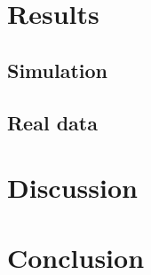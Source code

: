 \documentclass[aps,prd,twocolumn,superscriptaddress,preprintnumbers,nofootinbib,hidelinks]{revtex4-2}
\begin{document}
\section{Results}
\label{sec:results}

\subsection{Simulation}
\label{sec:injection-results}



\subsection{Real data}
\label{sec:real-data-results}



\section{Discussion}
\label{sec:discussion}




\section{Conclusion}
\label{sec:conclusion}
\end{document}
